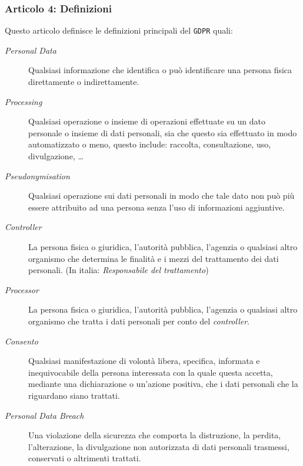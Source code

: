         \subsubsection{Articolo 4: Definizioni}
            Questo articolo definisce le definizioni principali del \texttt{GDPR} quali:
            \begin{description}
                \item[\textit{Personal Data}] Qualsiasi informazione che identifica o può identificare una persona fisica direttamente o indirettamente.
                \item[\textit{Processing}] Qualsiasi operazione o insieme di operazioni effettuate su un dato personale o insieme di dati personali, sia che questo sia effettuato in modo automatizzato o meno, questo include: raccolta, consultazione, uso, divulgazione, \dots
                \item[\textit{Pseudonymisation}] Qualsiasi operazione sui dati personali in modo che tale dato non può più essere attribuito ad una persona senza l'uso di informazioni aggiuntive.
                \item[\textit{Controller}] La persona fisica o giuridica, l'autorità pubblica, l'agenzia o qualsiasi altro organismo che determina le finalità e i mezzi del trattamento dei dati personali. (In italia: \textit{Responsabile del trattamento})
                \item[\textit{Processor}] La persona fisica o giuridica, l'autorità pubblica, l'agenzia o qualsiasi altro organismo che tratta i dati personali per conto del \textit{controller}.
                \item[\textit{Consento}] Qualsiasi manifestazione di volontà libera, specifica, informata e inequivocabile della persona interessata con la quale questa accetta, mediante una dichiarazione o un'azione positiva, che i dati personali che la riguardano siano trattati.
                \item[\textit{Personal Data Breach}] Una violazione della sicurezza che comporta la distruzione, la perdita, l'alterazione, la divulgazione non autorizzata di dati personali trasmessi, conservati o altrimenti trattati.
            \end{description}
